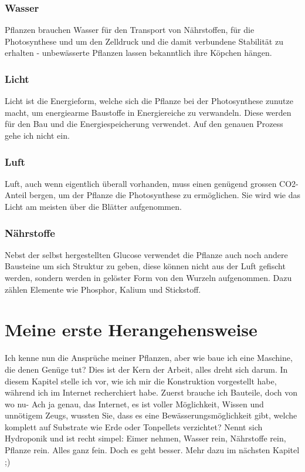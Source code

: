 \documentclass[12pt,titlepage,a4paper]{article}
\begin{document}
\subsubsection{Wasser}
Pflanzen brauchen Wasser für den Transport von Nährstoffen, für die Photosynthese und um den Zelldruck und die damit verbundene Stabilität zu erhalten - unbewässerte Pflanzen lassen bekanntlich ihre Köpchen hängen.


\subsubsection{Licht}
Licht ist die Energieform, welche sich die Pflanze bei der Photosynthese zunutze macht, um energiearme Baustoffe in Energiereiche zu verwandeln. Diese werden für den Bau und die Energiespeicherung verwendet. Auf den genauen Prozess gehe ich  nicht ein.

\subsubsection{Luft}
Luft, auch wenn eigentlich überall vorhanden, muss einen genügend grossen CO2-Anteil bergen, um der Pflanze die Photosynthese zu ermöglichen. Sie wird wie das Licht am meisten über die Blätter aufgenommen.

\subsubsection{Nährstoffe}
Nebst der selbst hergestellten Glucose verwendet die Pflanze auch noch andere Bausteine um sich Struktur zu geben, diese können nicht aus der Luft gefischt werden, sondern werden in gelöster Form von den Wurzeln aufgenommen. Dazu zählen Elemente wie Phosphor, Kalium und Stickstoff.







\section{Meine erste Herangehensweise}
Ich kenne nun die Ansprüche meiner Pflanzen, aber wie baue ich eine Maschine, die denen Genüge tut? Dies ist der Kern der Arbeit, alles dreht sich darum. In diesem Kapitel stelle ich vor, wie ich mir die Konstruktion vorgestellt habe, während ich im Internet recherchiert habe. Zuerst brauche ich Bauteile, doch von wo nu- Ach ja genau, das Internet, es ist voller Möglichkeit, Wissen und unnötigem Zeugs, wussten Sie, dass es eine Bewässerungsmöglichkeit gibt, welche komplett auf Substrate wie Erde oder Tonpellets verzichtet? Nennt sich Hydroponik und ist recht simpel: Eimer nehmen, Wasser rein, Nährstoffe rein, Pflanze rein. Alles ganz fein. Doch es geht besser. Mehr dazu im nächsten Kapitel ;)
\end{document}
